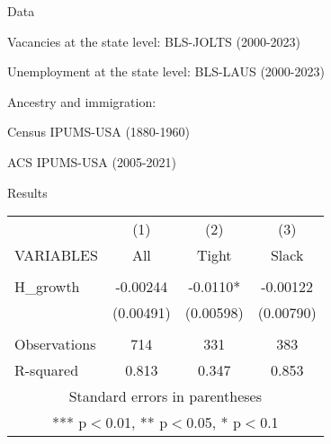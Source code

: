 \documentclass[aspectratio=169]{beamer}
\newenvironment{wideitemize}{\itemize\addtolength{\itemsep}{10pt}}{\enditemize}
\begin{document}
\begin{frame}{Data}
    \begin{wideitemize}
        \item Vacancies at the state level: BLS-JOLTS (2000-2023)
        \item Unemployment at the state level: BLS-LAUS (2000-2023)
        \item Ancestry and immigration:
        \begin{wideitemize}
            \item Census IPUMS-USA (1880-1960)
            \item ACS IPUMS-USA (2005-2021)
        \end{wideitemize}
    \end{wideitemize}
\end{frame}

\begin{frame}{Results}
\centering
    \begin{tabular}{lccc} \hline
     & (1) & (2) & (3) \\
    VARIABLES & All & Tight & Slack \\ \hline
     &  &  &  \\
    H\_growth & -0.00244 & -0.0110* & -0.00122 \\
     & (0.00491) & (0.00598) & (0.00790) \\
     &  &  &  \\
    Observations & 714 & 331 & 383 \\
     R-squared & 0.813 & 0.347 & 0.853 \\ \hline
    \multicolumn{4}{c}{ Standard errors in parentheses} \\
    \multicolumn{4}{c}{ *** p$<$0.01, ** p$<$0.05, * p$<$0.1} \\
    \end{tabular}
\end{frame}
\end{document}
